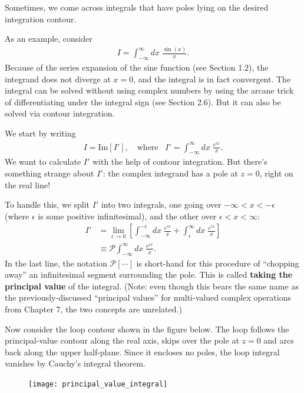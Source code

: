 \documentclass[10pt,a4paper]{article}
\begin{document}
Sometimes, we come across integrals that have poles lying on the
desired integration contour.

As an example, consider
\begin{align}
  I = \int_{-\infty}^\infty dx\; \frac{\sin(x)}{x}.
\end{align}
Because of the series expansion of the sine function (see Section
1.2), the integrand does not diverge at $x = 0$, and the integral is
in fact convergent. The integral can be solved without using complex
numbers by using the arcane trick of differentiating under the
integral sign (see Section 2.6).  But it can also be solved via
contour integration.

We start by writing
\begin{align}
  I = \mathrm{Im}[I'], \quad \mathrm{where}\;\;\; I' = \int_{-\infty}^\infty dx\; \frac{e^{ix}}{x}.
\end{align}
We want to calculate $I'$ with the help of contour integration.  But
there's something strange about $I'$: the complex integrand has a pole
at $z = 0$, right on the real line!

To handle this, we split $I'$ into two integrals, one going over
$-\infty < x < -\epsilon$ (where $\epsilon$ is some positive
infinitesimal), and the other over $\epsilon < x < \infty$:
\begin{align}
  I' &= \lim_{\epsilon \rightarrow 0} \left[ \int_{-\infty}^{-\epsilon} dx\; \frac{e^{ix}}{x} + \int_{\epsilon}^\infty dx\; \frac{e^{ix}}{x}\right] \\
  &\equiv \mathcal{P} \int_{-\infty}^\infty dx\; \frac{e^{ix}}{x}.
\end{align}
In the last line, the notation $\mathcal{P}[\cdots]$ is short-hand for
this procedure of ``chopping away'' an infinitesimal segment
surrounding the pole.  This is called \textbf{taking the principal
  value} of the integral.  (Note: even though this bears the same name
as the previously-discussed ``principal values'' for multi-valued
complex operations from Chapter 7, the two concepts are unrelated.)

Now consider the loop contour shown in the figure below.  The loop
follows the principal-value contour along the real axis, skips over
the pole at $z = 0$ and arcs back along the upper half-plane.  Since
it encloses no poles, the loop integral vanishes by Cauchy's integral
theorem.

\begin{figure}[ht]
  \centering\texttt{[image: principal\_value\_integral]}
\end{figure}
\end{document}
